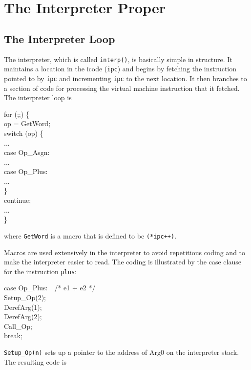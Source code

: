 \section{The Interpreter Proper}
\subsection{The Interpreter Loop}

The interpreter, which is called \texttt{interp()}, is basically
simple in structure. It maintains a location in the icode
(\texttt{ipc}) and begins by fetching the instruction pointed to by
\texttt{ipc} and incrementing \texttt{ipc} to the next location. It
then branches to a section of code for processing the virtual machine
instruction that it fetched. The interpreter loop is

\begin{iconcode}
\>for (;;) \{\\
\>\>op = GetWord;\\
\>\>switch (op) \{\\
\>\>\>...\\
\>\>\>case Op\_Asgn:\\
\>\>\>...\\
\>\>\>case Op\_Plus:\\
\>\>\>...\\
\>\>\>\}\\
\>\>continue;\\
\>\>\>...\\
\>\>\}
\end{iconcode}

\noindent
where \texttt{GetWord} is a macro that is defined to be \texttt{(*ipc++)}.

Macros are used extensively in the interpreter to avoid repetitious
coding and to make the interpreter easier to read.  The coding is
illustrated by the case clause for the instruction \texttt{plus}:

\begin{iconcode}
\>case Op\_Plus:\ \ /* e1 + e2 */\\
\>\>Setup\_Op(2);\\
\>\>DerefArg(1);\\
\>\>DerefArg(2);\\
\>\>Call\_Op;\\
\>\>break;
\end{iconcode}



\texttt{Setup\_Op(n)} sets up a pointer to the address of Arg0 on the
interpreter stack. The resulting code is

